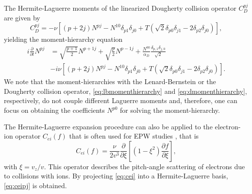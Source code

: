 %
{The Hermite-Laguerre moments of the linearized Dougherty collision operator $C_D^{pj}$ are given by
%
\begin{equation}
    C_{D}^{pj}=-\nu \left[(p+2j) N^{pj} - N^{10} \delta_{p1}\delta_{j0}+T(\sqrt{2}\delta_{p0}\delta_{j1}-2\delta_{p2}\delta_{j0})\right],
\end{equation}
}
%
{yielding} the moment-hierarchy equation
%
\begin{align}
    i \frac{\partial}{\partial t} N^{pj} &= \sqrt{\frac{p+1}{2}}N^{p+1 j}+\sqrt{\frac{p}{2}}N^{p-1 j}+ \frac{N^{00}}{\alpha_D}\frac{\delta_{p,1}\delta_{j,0}}{\sqrt{2}}\nonumber\\
    &-i\nu \left[(p+2j) N^{pj} - N^{10} \delta_{p1}\delta_{j0}+T(\sqrt{2}\delta_{p0}\delta_{j1}-2\delta_{p2}\delta_{j0})\right].
\label{eq:dmomenthierarchy}
\end{align}
%
{We note that the moment-hierarchies with the Lenard-Bernstein or the Dougherty collision operator, \cref{eq:lbmomenthierarchy} and \cref{eq:dmomenthierarchy}, respectively, do not couple different Laguerre moments and, therefore, one can focus on obtaining the coefficients $N^{p0}$ for solving the moment-hierarchy.}

The Hermite-Laguerre expansion procedure can also be applied to the electron-ion operator $C_{ei}(f)$ that is often used for EPW studies \citep{Epperlein1992,Banks2016}, that is
%
\begin{equation}
    C_{ei}(f) = \frac{\nu}{2 v^3}\frac{\partial}{\partial \xi}\left[\left(1-\xi^2\right)\frac{\partial f}{\partial \xi}\right],
\label{eq:cei}
\end{equation}
%
with $\xi = v_z/v$.
%
This operator describes the pitch-angle scattering of electrons due to collisions with ions.
%
By projecting \cref{eq:cei} into a Hermite-Laguerre basis, \cref{eq:ceipj} is obtained.

